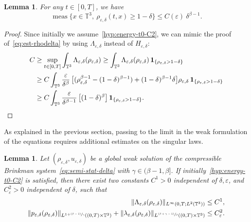 \documentclass[JEP,XML,SOM,Unicode,NoEqCountersInSection]{cedram}
\newcommand{\<}{\bigl\langle}
\renewcommand{\>}{\bigr\rangle}
\newcommand{\psfrac}[2]{\sfrac{(#1)}{#2}}
\DeclareMathOperator{\meas}{meas}
\newtheorem{lem}[thm]{Lemma}
\theoremstyle{definition}
\theoremstyle{remark}
\newcommand{\TT}{\mathbb{T}^3}
\let\ep\varepsilon
\begin{document}
\begin{lem}\label{lem:bound-rhod-Lambda}
For any $t \in [0,T]$, we have
\begin{equation}\label{eq:est-rho-delta-2}
\meas \big\{ x\in \TT, \ \rho_{\ep,\delta}(t,x) \geq 1-\delta \big\} \leq C(\ep) \ \delta^{\beta-1}.
\end{equation}
\end{lem}

\begin{proof} 
Since initially we assume~\eqref{hyp:energy-t0-C2}, we can mimic the proof of~\eqref{eq:est-rhodelta} by using $\Lambda_{\ep,\delta}$ instead of $H_{\ep,\delta}$:
\begin{align*}
C &\geq \sup_{t\in [0,T]} \int_{\TT}{\Lambda_{\ep,\delta}(\rho_{\ep,\delta})}
 \geq \int_{\TT}{\Lambda_{\ep,\delta}(\rho_{\ep,\delta}) \,\mathbf{1}_{\{ \rho_{\ep,\delta} > 1-\delta \}}} \\
& \geq C\int_{\TT}{\dfrac{\ep}{\delta^\beta}\,\bigl[
(\rho_{\varepsilon,\delta}^{\beta-1} - (1-\delta)^{\beta-1})
+ (1-\delta)^{\beta-1}\delta \bigr] \rho_{\ep,\delta}
\,\mathbf{1}_{\{ \rho_{\ep,\delta} > 1-\delta \}}} \\
& \geq C\int_{\TT}{\dfrac{\ep}{\delta^{\beta-1} }\,\bigl[
(1-\delta)^{\beta} \bigr]
\,\mathbf{1}_{\{ \rho_{\ep,\delta} > 1-\delta \}}}.\qedhere
\end{align*}
\end{proof}

As explained in the previous section, passing to the limit in the weak formulation of the equations requires additional estimates on the singular laws.

\begin{lem}\label{lem:controls-2}Let $(\rho_{\varepsilon, \delta}, u_{\varepsilon,\delta})$ be a global weak solution of the compressible Brinkman system~\eqref{eq:semi-stat-delta} with $\gamma \in (\beta-1,\beta]$.
If initially~\eqref{hyp:energy-t0-C2} is satisfied, then there exist two constants $C^1>0$ independent of $\delta,\ep$, and $C^2_\ep> 0$ independent of $\delta$, such that
\begin{align*}
\|\Lambda_{\ep,\delta}(\rho_{\ep,\delta})\|_{L^\infty(0,T; L^2(\TT))}
&\leq C^1,\\
\|p_{\ep,\delta}(\rho_{\ep,\delta})\|_{L^{1+\psfrac{\beta-1}{\gamma}}((0,T)\times \TT)} + \|\lambda_{\ep,\delta}(\rho_{\ep,\delta})\|_{L^{\psfrac{\beta + \gamma -1}{\beta}}((0,T)\times \TT)}
&\leq C^2_\ep.
\end{align*}
\end{lem}
\end{document}
